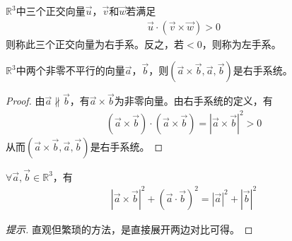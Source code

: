 \begin{definition}[右手系]
  $\mathbb{R}^3$中三个正交向量$\vec u$，$\vec v$和$\vec w$若满足
  \begin{align*}
    \vec u \cdot (\vec v\times \vec w) > 0
  \end{align*}
  则称此三个正交向量为右手系。反之，若$<0$，则称为左手系。
\end{definition}

\begin{lemma}
  $\mathbb{R}^3$中两个非零不平行的向量$\vec a$，$\vec b$，则$(\vec a\times \vec b, \vec a, \vec b)$是右手系统。
\end{lemma}
\begin{proof}
  由$\vec a\not\parallel\vec b$，有$\vec a \times \vec b$为非零向量。由右手系统的定义，有
  \begin{align*}
    (\vec a\times \vec b) \cdot (\vec a\times \vec b) = \left| \vec a\times \vec b \right|^2 > 0
  \end{align*}
  从而$(\vec a\times \vec b, \vec a, \vec b)$是右手系统。
\end{proof}

\begin{lemma}
  $\forall \vec a, \vec b\in\mathbb{R}^3$，有
  \begin{align*}
    \left|\vec a\times \vec b\right|^2 + (\vec a\cdot \vec b)^2 =
    \left|\vec a\right|^2 + \left|\vec b\right|^2
  \end{align*}
\end{lemma}
\begin{proof}[提示]
  直观但繁琐的方法，是直接展开两边对比可得。
\end{proof}


